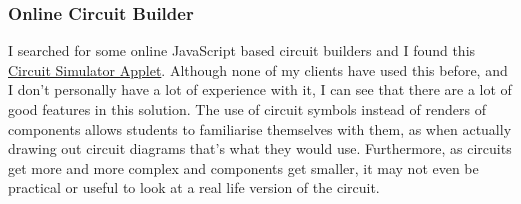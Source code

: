 \documentclass[11pt]{article}
\begin{document}
            \subsubsection{Online Circuit Builder}
                I searched for some online JavaScript based circuit builders and I found this \href{https://www.falstad.com/circuit/}{Circuit Simulator Applet}. Although none of my clients have used this before, and I don't personally have a lot of experience with it, I can see that there are a lot of good features in this solution. The use of circuit symbols instead of renders of components allows students to familiarise themselves with them, as when actually drawing out circuit diagrams that's what they would use. Furthermore, as circuits get more and more complex and components get smaller, it may not even be practical or useful to look at a real life version of the circuit. 


\end{document}
